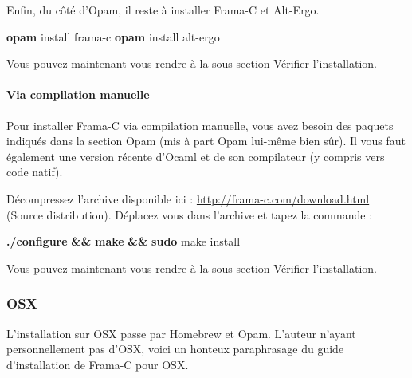 \documentclass[12pt,francais,]{scrbook}
\newenvironment{Shaded}{}{}
\newcommand{\KeywordTok}[1]{\textcolor[rgb]{0.00,0.44,0.13}{\textbf{{#1}}}}
\newcommand{\NormalTok}[1]{{#1}}
\begin{document}
Enfin, du côté d'Opam, il reste à installer Frama-C et Alt-Ergo.

\begin{footnotesize}\begin{Shaded}
\begin{Highlighting}[]
\KeywordTok{opam} \NormalTok{install frama-c}
\KeywordTok{opam} \NormalTok{install alt-ergo}
\end{Highlighting}
\end{Shaded}\end{footnotesize}

Vous pouvez maintenant vous rendre à la sous section \og{}Vérifier
l'installation\fg{}.

\paragraph{\texorpdfstring{Via compilation
\og{}manuelle\fg{}}{Via compilation manuelle}}\label{via-compilation-manuelle}

Pour installer Frama-C via compilation manuelle, vous avez besoin des
paquets indiqués dans la section Opam (mis à part Opam lui-même bien
sûr). Il vous faut également une version récente d'Ocaml et de son
compilateur (y compris vers code natif).

Décompressez l'archive disponible ici :
\url{http://frama-c.com/download.html} (Source distribution). Déplacez
vous dans l'archive et tapez la commande :

\begin{footnotesize}\begin{Shaded}
\begin{Highlighting}[]
\KeywordTok{./configure} \KeywordTok{&&} \KeywordTok{make} \KeywordTok{&&} \KeywordTok{sudo} \NormalTok{make install}
\end{Highlighting}
\end{Shaded}\end{footnotesize}

Vous pouvez maintenant vous rendre à la sous section \og{}Vérifier
l'installation\fg{}.

\subsubsection{OSX}\label{osx}

L'installation sur OSX passe par Homebrew et Opam. L'auteur n'ayant
personnellement pas d'OSX, voici un honteux paraphrasage du guide
d'installation de Frama-C pour OSX.
\end{document}

